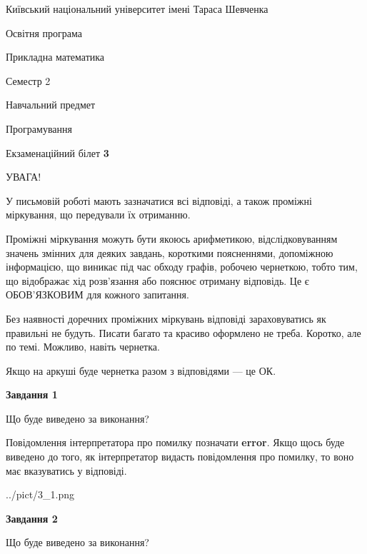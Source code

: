 \documentclass[12pt, ukrainian]{article}
\begin{document}
{{\begin {small}\par
{ \center  Київський національний університет імені Тараса Шевченка \par}
{\parbox {5 cm}{Освітня програма \hfill}{\parbox {7 cm}{Прикладна математика \hfill}}\parbox {6 cm}{\hfill Семестр 2}}\par
{\parbox {5 cm} {Навчальний предмет \hfill}\parbox {7 cm}{Програмування \hfill}\parbox {6cm}{\hfill}\par}\vspace{-7pt} \end{small}}{\center Екзаменаційний білет \No \textbf
{ 3 }\par}}
{
\begin {large}
УВАГА!

У письмовій роботі мають зазначатися всі відповіді, а також проміжні міркування, що передували їх отриманню.

Проміжні міркування можуть бути якоюсь арифметикою, відслідковуванням зна\-чень змінних для деяких завдань,
короткими поясненнями, допоміжною інформацією, що виникає під час обходу графів, робочею чернеткою,
тобто тим, що відображає хід розв’язання або пояснює отриману відповідь.
Це є ОБОВ’ЯЗКОВИМ для кожного запитання.

Без наявності доречних проміжних міркувань відповіді зараховуватись як правиль\-ні не будуть.
Писати багато та красиво оформлено не треба. Коротко, але по темі. Можли\-во, навіть чернетка.

Якщо на аркуші буде чернетка разом з відповідями --- це ОК.

\newpage

{\begin {center}\textbf{Завдання 1}\end {center}}\par
Що буде виведено за виконання?

Повідомлення інтерпретатора про помилку позначати \textbf{error}.
Якщо щось буде виведено до того, як інтерпретатор видасть повідомлення про помилку, 
то воно має вказуватись у відповіді. \par


\begin{center}
	{../pict/3_1.png}
\end{center}
\newpage

{\begin {center}\textbf{Завдання 2}\end {center}}\par
Що буде виведено за виконання?


\end{large}}
\end{document}
